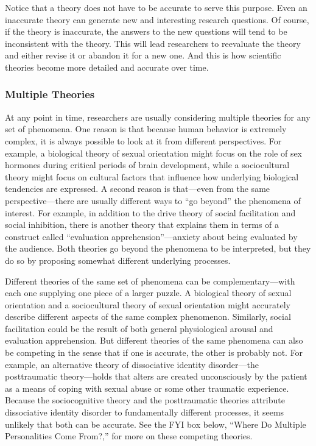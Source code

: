 \documentclass[
]{krantz}
\begin{document}
Notice that a theory does not have to be accurate to serve this purpose. Even an inaccurate theory can generate new and interesting research questions. Of course, if the theory is inaccurate, the answers to the new questions will tend to be inconsistent with the theory. This will lead researchers to reevaluate the theory and either revise it or abandon it for a new one. And this is how scientific theories become more detailed and accurate over time.

\hypertarget{multiple-theories}{%
\subsubsection*{Multiple Theories}\label{multiple-theories}}


At any point in time, researchers are usually considering multiple theories for any set of phenomena. One reason is that because human behavior is extremely complex, it is always possible to look at it from different perspectives. For example, a biological theory of sexual orientation might focus on the role of sex hormones during critical periods of brain development, while a sociocultural theory might focus on cultural factors that influence how underlying biological tendencies are expressed. A second reason is that---even from the same perspective---there are usually different ways to ``go beyond'' the phenomena of interest. For example, in addition to the drive theory of social facilitation and social inhibition, there is another theory that explains them in terms of a construct called ``evaluation apprehension''---anxiety about being evaluated by the audience. Both theories go beyond the phenomena to be interpreted, but they do so by proposing somewhat different underlying processes.

Different theories of the same set of phenomena can be complementary---with each one supplying one piece of a larger puzzle. A biological theory of sexual orientation and a sociocultural theory of sexual orientation might accurately describe different aspects of the same complex phenomenon. Similarly, social facilitation could be the result of both general physiological arousal and evaluation apprehension. But different theories of the same phenomena can also be competing in the sense that if one is accurate, the other is probably not. For example, an alternative theory of dissociative identity disorder---the posttraumatic theory---holds that alters are created unconsciously by the patient as a means of coping with sexual abuse or some other traumatic experience. Because the sociocognitive theory and the posttraumatic theories attribute dissociative identity disorder to fundamentally different processes, it seems unlikely that both can be accurate. See the FYI box below, ``Where Do Multiple Personalities Come From?,'' for more on these competing theories.
\end{document}
